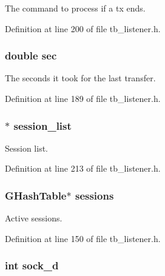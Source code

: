 The command to process if a tx ends. 



Definition at line 200 of file tb\-\_\-listener.\-h.

\hypertarget{structtb__listener__t_a741d9964fa8029b9468528756ea835af}{
\subsubsection[{sec}]{\setlength{\rightskip}{0pt plus 5cm}double sec}}\label{structtb__listener__t_a741d9964fa8029b9468528756ea835af}


The seconds it took for the last transfer. 



Definition at line 189 of file tb\-\_\-listener.\-h.

\hypertarget{structtb__listener__t_a948f8e60166821d3db232c56a59b195c}{
\subsubsection[{session\-\_\-list}]{$\ast$ session\-\_\-list}}\label{structtb__listener__t_a948f8e60166821d3db232c56a59b195c}


Session list. 



Definition at line 213 of file tb\-\_\-listener.\-h.

\hypertarget{structtb__listener__t_a696d2a3fd36c8895302b9372d1e55935}{
\subsubsection[{sessions}]{\setlength{\rightskip}{0pt plus 5cm}G\-Hash\-Table$\ast$ sessions}}\label{structtb__listener__t_a696d2a3fd36c8895302b9372d1e55935}


Active sessions. 



Definition at line 150 of file tb\-\_\-listener.\-h.

\hypertarget{structtb__listener__t_a94d540b145f21be2f9b28a2c225ccf30}{
\subsubsection[{sock\-\_\-d}]{\setlength{\rightskip}{0pt plus 5cm}int sock\-\_\-d}}\label{structtb__listener__t_a94d540b145f21be2f9b28a2c225ccf30}


